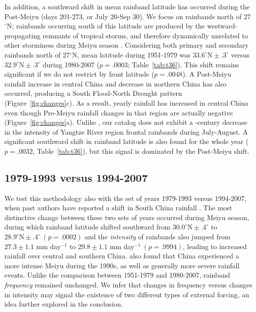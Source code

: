 \documentclass{ametsoc}
\begin{document}
	In addition, a southward shift in mean rainband latitude has occurred during the Post-Meiyu (days 201-273, or July 20-Sep 30). We focus on rainbands north of 27$^{\circ}$N; rainbands occurring south of this latitude are produced by the westward-propagating remnants of tropical storms, and therefore dynamically unrelated to other storminess during Meiyu season \citep{Day2015}. Considering both primary and secondary rainbands north of 27$^{\circ}$N, mean latitude during 1951-1979 was $33.6^\circ \textrm{N} \pm .3^\circ$ versus $32.9^\circ \textrm{N} \pm .3^\circ$ during 1980-2007 ($p=.0003$; Table~\ref{tab:t36}). This shift remains significant if we do not restrict by front latitude ($p=.0048$). A Post-Meiyu rainfall increase in central China and decrease in northern China has also occurred, producing a South Flood-North Drought pattern (Figure~\ref{fig:changes}c). As a result, yearly rainfall has increased in central China even though Pre-Meiyu rainfall changes in that region are actually negative (Figure~\ref{fig:changes}a). Unlike \citet{Yu2010}, our catalog does not exhibit a -century decrease in the intensity of Yangtze River region frontal rainbands during July-August. A significant southward shift in rainband latitude is also found for the whole year ($p=.0032$, Table~\ref{tab:t36}), but this signal is dominated by the Post-Meiyu shift.
	
\subsection{1979-1993 versus 1994-2007}
	
	We test this methodology also with the set of years 1979-1993 versus 1994-2007, when past authors have reported a shift in South China rainfall \citep{Kwon2007,Wu2010,Yim2013}. The most distinctive change between these two sets of years occurred during Meiyu season, during which rainband latitude shifted southward from $30.0^\circ \textrm{N} \pm .4^\circ$ to $28.9^\circ \textrm{N} \pm .4^\circ\ (p=.0002)$ and the \textit{intensity} of rainbands also jumped from $27.3 \pm 1.1$ mm day$^{-1}$ to $29.8 \pm 1.1$ mm day$^{-1}\ (p=.9994)$, leading to increased rainfall over central and southern China. \citet{Zou2015} also found that China experienced a more intense Meiyu during the 1990s, as well as generally more severe rainfall events. Unlike the comparison between 1951-1979 and 1980-2007, rainband \textit{frequency} remained unchanged. We infer that changes in frequency versus changes in intensity may signal the existence of two different types of external forcing, an idea further explored in the conclusion.
	
\end{document}
